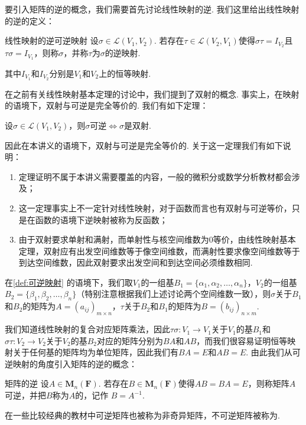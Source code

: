 要引入矩阵的逆的概念，我们需要首先讨论线性映射的逆. 我们这里给出线性映射的逆的定义：
\begin{definition}{线性映射的逆}{可逆映射} 
    设$\sigma \in \mathcal{L}(V_1,V_2)$. 若存在$\tau \in \mathcal{L}(V_2,V_1)$使得$\sigma \tau = I_{V_2}$且$\tau \sigma = I_{V_1}$，则称$\sigma$，并称$\tau$为$\sigma$的逆映射.
\end{definition}
其中$I_{V_1}$和$I_{V_2}$分别是$V_1$和$V_2$上的恒等映射.

在之前有关线性映射基本定理的讨论中，我们提到了双射的概念. 事实上，在映射的语境下，双射与可逆是完全等价的. 我们有如下定理：
\begin{theorem}{}{}
    设$\sigma \in \mathcal{L}(V_1,V_2)$，则$\sigma$可逆$\iff \sigma$是双射.
\end{theorem}

因此在本讲义的语境下，双射与可逆是完全等价的. 关于这一定理我们有如下说明：
\begin{enumerate}
    \item 定理证明不属于本讲义需要覆盖的内容，一般的微积分或数学分析教材都会涉及；

    \item 这一定理事实上不一定针对线性映射，对于函数而言也有双射与可逆等价，只是在函数的语境下逆映射被称为反函数；

    \item 由于双射要求单射和满射，而单射性与核空间维数为0等价，由线性映射基本定理，双射应有出发空间维数等于像空间维数，而满射性要求像空间维数等于到达空间维数，因此双射要求出发空间和到达空间必须维数相同.
\end{enumerate}

在\autoref{def:可逆映射} 的语境下，我们取$V_1$的一组基$B_1=\{\alpha_1,\alpha_2,\ldots,\alpha_n\}$，$V_2$的一组基$B_2=\{\beta_1,\beta_2,\ldots,\beta_n\}$（特别注意根据我们上述讨论两个空间维数一致），则$\sigma$关于$B_1$和$B_2$的矩阵为$A=(a_{ij})_{m \times n}$，$\tau$关于$B_2$和$B_1$的矩阵为$B=(b_{ij})_{n \times m}$.

我们知道线性映射的复合对应矩阵乘法，因此$\tau\sigma:V_1\to V_1$关于$V_1$的基$B_1$和$\sigma\tau:V_2\to V_2$关于$V_2$的基$B_2$对应的矩阵分别为$BA$和$AB$，而我们很容易证明恒等映射关于任何基的矩阵均为单位矩阵，因此我们有$BA=E$和$AB=E$. 由此我们从可逆映射的角度引入矩阵的逆的概念：
\begin{definition}{矩阵的逆}{}
    设$A \in \mathbf{M}_n(\mathbf{F})$. 若存在$B \in \mathbf{M}_n(\mathbf{F})$使得$AB=BA=E$，则称矩阵$A$可逆，并把$B$称为$A$的，记作 $ B = A^{-1} $.
\end{definition}
在一些比较经典的教材中可逆矩阵也被称为非奇异矩阵，不可逆矩阵被称为.

